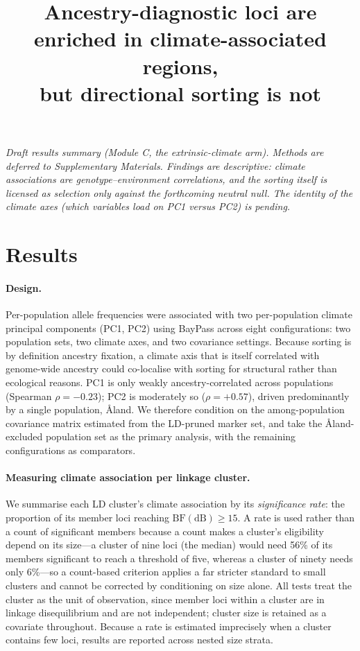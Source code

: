 \documentclass[11pt]{article}
\title{\vspace{-3em}Ancestry-diagnostic loci are enriched in climate-associated
regions,\\ but directional sorting is not}
\author{}
\date{}
\newcommand{\BF}{\ensuremath{\mathrm{BF}(\mathrm{dB})}}
\begin{document}
\maketitle
\vspace{-4em}

\noindent\textit{Draft results summary (Module C, the extrinsic-climate arm).
Methods are deferred to Supplementary Materials. Findings are descriptive:
climate associations are genotype--environment correlations, and the sorting
itself is licensed as selection only against the forthcoming neutral null. The
identity of the climate axes (which variables load on PC1 versus PC2) is
pending.}

\section*{Results}

\paragraph{Design.}
Per-population allele frequencies were associated with two per-population climate
principal components (PC1, PC2) using BayPass across eight configurations: two
population sets, two climate axes, and two covariance settings. Because sorting is
by definition ancestry fixation, a climate axis that is itself correlated with
genome-wide ancestry could co-localise with sorting for structural rather than
ecological reasons. PC1 is only weakly ancestry-correlated across populations
(Spearman $\rho = -0.23$); PC2 is moderately so ($\rho = +0.57$), driven
predominantly by a single population, {\AA}land. We therefore condition on the
among-population covariance matrix estimated from the LD-pruned marker set, and
take the {\AA}land-excluded population set as the primary analysis, with the
remaining configurations as comparators.

\paragraph{Measuring climate association per linkage cluster.}
We summarise each LD cluster's climate association by its \emph{significance
rate}: the proportion of its member loci reaching $\BF \ge 15$. A rate is used
rather than a count of significant members because a count makes a cluster's
eligibility depend on its size---a cluster of nine loci (the median) would need
56\% of its members significant to reach a threshold of five, whereas a cluster of
ninety needs only 6\%---so a count-based criterion applies a far stricter standard
to small clusters and cannot be corrected by conditioning on size alone. All tests
treat the cluster as the unit of observation, since member loci within a cluster
are in linkage disequilibrium and are not independent; cluster size is retained as
a covariate throughout. Because a rate is estimated imprecisely when a cluster
contains few loci, results are reported across nested size strata.
\end{document}
